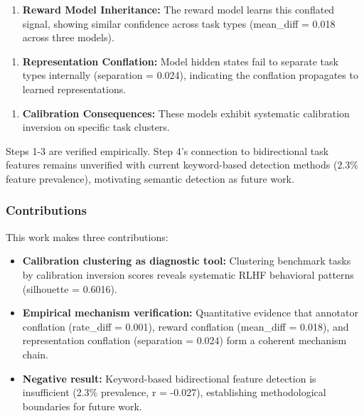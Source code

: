 \begin{enumerate}
\item \textbf{Reward Model Inheritance:} The reward model learns this conflated signal, showing similar confidence across task types (mean\_diff = 0.018 across three models).
\end{enumerate}

\begin{enumerate}
\item \textbf{Representation Conflation:} Model hidden states fail to separate task types internally (separation = 0.024), indicating the conflation propagates to learned representations.
\end{enumerate}

\begin{enumerate}
\item \textbf{Calibration Consequences:} These models exhibit systematic calibration inversion on specific task clusters.
\end{enumerate}

Steps 1-3 are verified empirically. Step 4's connection to bidirectional task features remains unverified with current keyword-based detection methods (2.3\% feature prevalence), motivating semantic detection as future work.

\subsubsection{Contributions}

This work makes three contributions:

\begin{itemize}
\item \textbf{Calibration clustering as diagnostic tool:} Clustering benchmark tasks by calibration inversion scores reveals systematic RLHF behavioral patterns (silhouette = 0.6016).
\end{itemize}

\begin{itemize}
\item \textbf{Empirical mechanism verification:} Quantitative evidence that annotator conflation (rate\_diff = 0.001), reward conflation (mean\_diff = 0.018), and representation conflation (separation = 0.024) form a coherent mechanism chain.
\end{itemize}

\begin{itemize}
\item \textbf{Negative result:} Keyword-based bidirectional feature detection is insufficient (2.3\% prevalence, r = -0.027), establishing methodological boundaries for future work.
\end{itemize}
